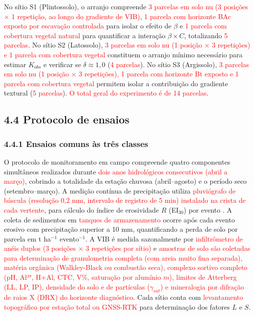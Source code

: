 \documentclass[
  brazilian,
  authoryear,
  preprint]{elsarticle}
\begin{document}
No sítio S1 (Plintossolo), o arranjo compreende \textcolor{red}{3
parcelas em solo nu (3 posições × 1 repetição, ao longo do gradiente de
VIB)}, \textcolor{red}{1 parcela com horizonte BAc exposto por escavação
controlada} para isolar o efeito de \(\beta\) e \textcolor{red}{1
parcela com cobertura vegetal natural} para quantificar a interação
\(\beta \times C\), totalizando \textcolor{red}{5 parcelas}. No sítio S2
(Latossolo), \textcolor{red}{3 parcelas em solo nu (1 posição × 3
repetições) e 1 parcela com cobertura vegetal} constituem o arranjo
mínimo necessário para estimar \(K_{obs}\) e verificar se
\(\delta \approx 1{,}0\) (\textcolor{red}{4 parcelas}). No sítio S3
(Argissolo), \textcolor{red}{3 parcelas em solo nu (1 posição × 3
repetições), 1 parcela com horizonte Bt exposto e 1 parcela com
cobertura vegetal} permitem isolar a contribuição do gradiente textural
(\textcolor{red}{5 parcelas}). \textcolor{red}{O total geral do
experimento é de 14 parcelas}.

\subsection{4.4 Protocolo de ensaios}\label{protocolo-de-ensaios}

\subsubsection{4.4.1 Ensaios comuns às três
classes}\label{ensaios-comuns-uxe0s-truxeas-classes}

O protocolo de monitoramento em campo compreende quatro componentes
simultâneos realizados durante \textcolor{red}{dois anos hidrológicos
consecutivos (abril a março)}, cobrindo a totalidade da estação chuvosa
(abril--agosto) e o período seco (setembro--março). A medição contínua
de precipitação utiliza \textcolor{red}{pluviógrafo de báscula
(resolução 0,2 mm, intervalo de registro de 5 min) instalado na crista
de cada vertente}, para cálculo do índice de erosividade \(R\)
(EI\(_{30}\)) por evento \citep{wischmeier_smith_1978}. A coleta de
sedimentos em \textcolor{red}{tanques de armazenamento} ocorre após cada
evento erosivo com precipitação superior a 10 mm, quantificando a perda
de solo por parcela em t ha\(^{-1}\) evento\(^{-1}\). A VIB é medida
sazonalmente por \textcolor{red}{infiltrômetro de anéis duplos (3
posições × 3 repetições por sítio)} e \textcolor{red}{amostras de solo
são coletadas para determinação de granulometria completa (com areia
muito fina separada), matéria orgânica (Walkley-Black ou combustão
seca), complexo sortivo completo (pH, Al³⁺, H+Al, CTC, V\%, saturação
por alumínio \(m\)), limites de Atterberg (LL, LP, IP), densidade do
solo e de partículas (\(\gamma_{sat}\)) e mineralogia por difração de
raios X (DRX) do horizonte diagnóstico}. Cada sítio conta com
\textcolor{red}{levantamento topográfico por estação total ou GNSS-RTK}
para determinação dos fatores \(L\) e \(S\).
\end{document}
